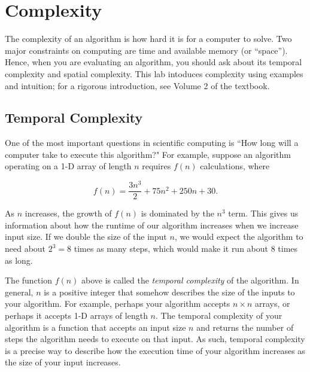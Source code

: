 
\label{lab:complexity}

\section*{Complexity}
The complexity of an algorithm is how hard it is for a computer to solve. 
Two major constraints on computing are time and available memory (or ``space''). 
Hence, when you are evaluating an algorithm, you should ask about its temporal complexity and spatial complexity. 
This lab intoduces complexity using examples and intuition; for a rigorous introduction, see Volume 2 of the textbook.

\subsection*{Temporal Complexity}
One of the most important questions in scientific computing is ``How long will a computer take to execute this algorithm?"
For example, suppose an algorithm operating on a 1-D array of length $n$ requires $f(n)$ calculations, where

\begin{equation*}
f(n) = \frac{3n^3}{2} + 75n^2 + 250n + 30.
\end{equation*}

As $n$ increases, the growth of $f(n)$ is dominated by the $n^3$ term.
This gives us information about how the runtime of our algorithm increases when we increase input size. 
If we double the size of the input $n$, we would expect the algorithm to need about $2^3=8$ times as many steps, which would make it run about 8 times as long.

The function $f(n)$ above is called the \emph{temporal complexity} of the algorithm. 
In general, $n$ is a positive integer that somehow describes the size of the inputs to your algorithm. 
For example, perhaps your algorithm accepts $n \times n$ arrays, or perhaps it accepts 1-D arrays of length $n$. 
The temporal complexity of your algorithm is a function that accepts an input size $n$ and returns the number of steps the algorithm needs to execute on that input. 
As such, temporal complexity is a precise way to describe how the execution time of your algorithm increases as the size of your input increases.

